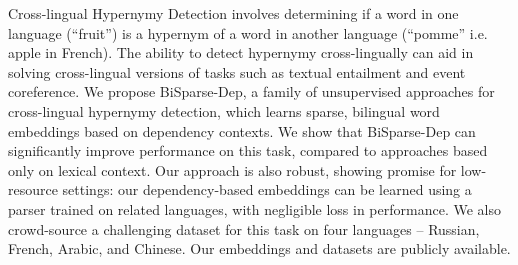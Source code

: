 Cross-lingual Hypernymy Detection involves determining if a word in one language (``fruit'') is a hypernym of a word in another language (``pomme'' i.e. apple in French). The ability to detect hypernymy cross-lingually can aid in solving cross-lingual versions of tasks such as textual entailment and event coreference. We propose BiSparse-Dep, a family of unsupervised approaches for cross-lingual hypernymy detection, which learns sparse, bilingual word embeddings based on dependency contexts. We show that BiSparse-Dep can significantly improve performance on this task, compared to approaches based only on lexical context. Our approach is also robust, showing promise for low-resource settings: our dependency-based embeddings can be learned using a parser trained on related languages, with negligible loss in performance. We also crowd-source a challenging dataset for this task on four languages -- Russian, French, Arabic, and Chinese. Our embeddings and datasets are publicly available.
